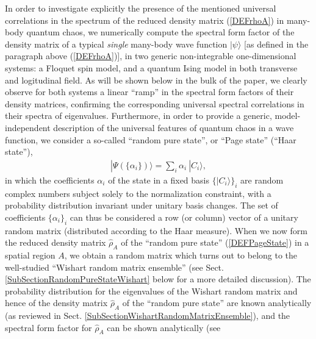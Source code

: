 \documentclass[aps,prb,preprint,onecolumn,amsmath,amssymb,superscriptaddress,eqsecnum,floatfix,scrartcl]{revtex4-1}
\begin{document}
In order to investigate explicitly
the presence of the mentioned
universal 
correlations
 in the spectrum of the reduced density matrix (\ref{DEFrhoA}) in many-body quantum chaos,
we numerically compute   the spectral form factor of the density matrix of a  typical 
{\it single} many-body  wave function $|\psi\rangle$  [as defined in the paragraph above (\ref{DEFrhoA})],  in two
generic  non-integrable  one-dimensional systems: a Floquet spin model, and a quantum Ising model in both transverse and logitudinal field. As will
be shown below
in the bulk of the paper, we clearly observe for  both
systems  a linear ``ramp'' in the spectral form factors of their density matrices,
confirming the 
corresponding universal spectral correlations
in  their  spectra of eigenvalues.
Furthermore, in
order to provide a generic, model-independent description of  the universal features of quantum chaos in a wave function, we consider a so-called  ``random pure state'',
or ``Page state'' (``Haar state'')\cite{Page1993}, 
\begin{align}
\label{DEFPageState}
|\Psi(\{\alpha_i\})\rangle=\sum_i\alpha_i \ |C_i\rangle,
\end{align}
in which the coefficients $\alpha_i$ of the state in a fixed 
 basis $\{ |C_i\rangle\}_i$ are random complex numbers subject solely to the normalization
constraint, with a probability distribution invariant under unitary basis changes. The set of coefficients  $\{\alpha_i\}_i$ can thus be considered a row (or column) vector of a 
unitary random matrix (distributed according to the Haar measure).
When we now form the 
reduced density matrix ${\hat  \rho}_A$ of the 
``random pure state''
 (\ref{DEFPageState})
in a spatial region $A$, we obtain a random matrix which turns out to  belong to the well-studied ``Wishart random matrix ensemble''
(see Sect. \ref{SubSectionRandomPureStateWishart} below for a more detailed discussion).
The probability distribution for the eigenvalues of the Wishart random matrix and hence of the density matrix ${\hat  \rho}_A$
of the ``random pure state''  are  known analytically (as reviewed in Sect. \ref{SubSectionWishartRandomMatrixEnsemble}), 
  and the spectral form factor for ${\hat \rho}_A$ can be shown analytically (see 
\end{document}
